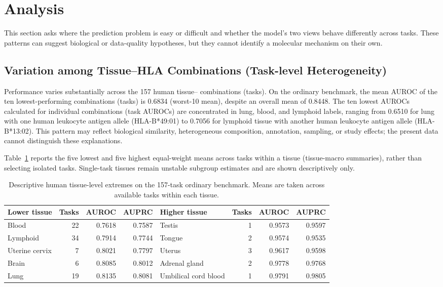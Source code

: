 \section{Analysis}

This section asks where the prediction problem is easy or difficult and whether the model's two views behave differently across tasks. These patterns can suggest biological or data-quality hypotheses, but they cannot identify a molecular mechanism on their own.

\subsection{Variation among Tissue--HLA Combinations (Task-level Heterogeneity)}

Performance varies substantially across the 157 human tissue--\plainHLA{} combinations (tasks). On the ordinary benchmark, the mean AUROC of the ten lowest-performing combinations (tasks) is 0.6834 (worst-10 mean), despite an overall mean of 0.8448. The ten lowest AUROCs calculated for individual combinations (task AUROCs) are concentrated in lung, blood, and lymphoid labels, ranging from 0.6510 for lung with one human leukocyte antigen allele (HLA-B*49:01) to 0.7056 for lymphoid tissue with another human leukocyte antigen allele (HLA-B*13:02). This pattern may reflect biological similarity, heterogeneous composition, annotation, sampling, or study effects; the present data cannot distinguish these explanations.

Table~\ref{tab:human-tissue-extremes} reports the five lowest and five highest equal-weight means across tasks within a tissue (tissue-macro summaries), rather than selecting isolated tasks. Single-task tissues remain unstable subgroup estimates and are shown descriptively only.

\begin{table}[tbp]
\centering
\caption{Descriptive human tissue-level extremes on the 157-task ordinary benchmark. Means are taken across available \plainHLA{} tasks within each tissue.}
\label{tab:human-tissue-extremes}
\footnotesize
\setlength{\tabcolsep}{2pt}
\begin{tabular}{lrrrlrrr}
\toprule
Lower tissue & Tasks & AUROC & AUPRC & Higher tissue & Tasks & AUROC & AUPRC \\ 
\midrule
Blood & 22 & 0.7618 & 0.7587 & Testis & 1 & 0.9573 & 0.9597 \\ 
Lymphoid & 34 & 0.7914 & 0.7744 & Tongue & 2 & 0.9574 & 0.9535 \\ 
Uterine cervix & 7 & 0.8021 & 0.7797 & Uterus & 3 & 0.9617 & 0.9598 \\ 
Brain & 6 & 0.8085 & 0.8012 & Adrenal gland & 2 & 0.9778 & 0.9768 \\ 
Lung & 19 & 0.8135 & 0.8081 & Umbilical cord blood & 1 & 0.9791 & 0.9805 \\ 
\bottomrule
\end{tabular}
\end{table}

